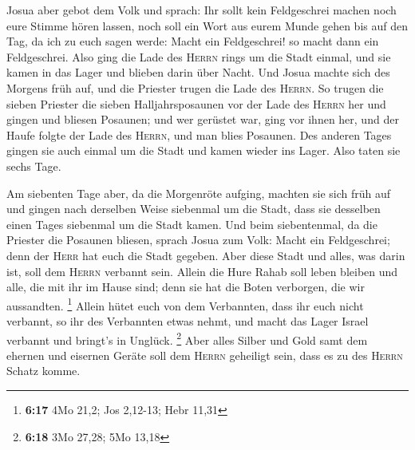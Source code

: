  Josua aber gebot dem Volk und sprach: Ihr sollt kein
Feldgeschrei machen noch eure Stimme hören lassen, noch soll ein Wort
aus eurem Munde gehen bis auf den Tag, da ich zu euch sagen werde: Macht
ein Feldgeschrei! so macht dann ein Feldgeschrei.  Also
ging die Lade des \textsc{Herrn} rings um die Stadt einmal, und sie
kamen in das Lager und blieben darin über Nacht.  Und
Josua machte sich des Morgens früh auf, und die Priester trugen die Lade
des \textsc{Herrn}.  So trugen die sieben Priester die
sieben Halljahrsposaunen vor der Lade des \textsc{Herrn} her und gingen
und bliesen Posaunen; und wer gerüstet war, ging vor ihnen her, und der
Haufe folgte der Lade des \textsc{Herrn}, und man blies Posaunen.
 Des anderen Tages gingen sie auch einmal um die Stadt
und kamen wieder ins Lager. Also taten sie sechs Tage.

 Am siebenten Tage aber, da die Morgenröte aufging,
machten sie sich früh auf und gingen nach derselben Weise siebenmal um
die Stadt, dass sie desselben einen Tages siebenmal um die Stadt kamen.
 Und beim siebentenmal, da die Priester die Posaunen
bliesen, sprach Josua zum Volk: Macht ein Feldgeschrei; denn der
\textsc{Herr} hat euch die Stadt gegeben.  Aber diese
Stadt und alles, was darin ist, soll dem \textsc{Herrn} verbannt sein.
Allein die Hure Rahab soll leben bleiben und alle, die mit ihr im Hause
sind; denn sie hat die Boten verborgen, die wir aussandten. \footnote{\textbf{6:17}
  4Mo 21,2; Jos 2,12-13; Hebr 11,31}  Allein hütet euch
von dem Verbannten, dass ihr euch nicht verbannt, so ihr des Verbannten
etwas nehmt, und macht das Lager Israel verbannt und bringt's in
Unglück. \footnote{\textbf{6:18} 3Mo 27,28; 5Mo 13,18} 
Aber alles Silber und Gold samt dem ehernen und eisernen Geräte soll dem
\textsc{Herrn} geheiligt sein, dass es zu des \textsc{Herrn} Schatz
komme.

